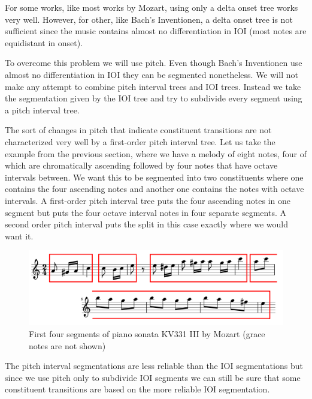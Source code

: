 \documentclass[a4paper,10pt]{article}
\begin{document}


For some works, like most works by Mozart, using only a delta onset tree works very well. However, for other, like Bach's Inventionen, a delta onset tree is not sufficient since the music contains almost no differentiation in IOI (most notes are equidistant in onset).

To overcome this problem we will use pitch. Even though Bach's Inventionen use almost no differentiation in IOI they can be segmented nonetheless. We will not make any attempt to combine pitch interval trees and IOI trees. Instead we take the segmentation given by the IOI tree and try to subdivide every segment using a pitch interval tree. 

The sort of changes in pitch that indicate constituent transitions are not characterized very well by a first-order pitch interval tree. Let us take the example from the previous section, where we have a melody of eight notes, four of which are chromatically ascending followed by four notes that have octave intervals between. We want this to be segmented into two constituents where one contains the four ascending notes and another one contains the notes with octave intervals. A first-order pitch interval tree puts the four ascending notes in one segment but puts the four octave interval notes in four separate segments. A second order pitch interval puts the split in this case exactly where we would want it.

\begin{figure}
\includegraphics[scale=3]{img/melodysegments}
\caption{First four segments of piano sonata KV331 III by Mozart (grace notes are not shown)}
\label{fig:mozartsegments}
\end{figure}

The pitch interval segmentations are less reliable than the IOI segmentations but since we use pitch only to subdivide IOI segments we can still be sure that some constituent transitions are based on the more reliable IOI segmentation.
\end{document}
